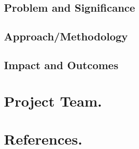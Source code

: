 \documentclass[11pt]{article} %
\begin{document}
\subsection{Problem and Significance}

\subsection{Approach/Methodology}
\subsection{Impact and Outcomes}
\section{Project Team.}
\section{References.}
\end{document}

